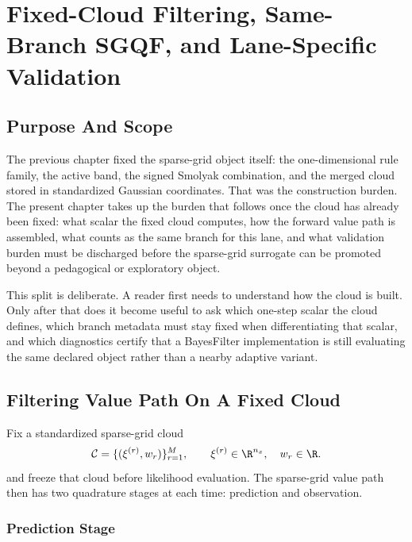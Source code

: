 \chapter{Fixed-Cloud Filtering, Same-Branch SGQF, and Lane-Specific Validation}
\label{ch:bf-highdim-fixed-cloud-sgqf-validation}
\providecommand{\widehatell}{\widehat{\ell}}
\providecommand{\dotwidehatell}{\dot{\widehat{\ell}}}
\providecommand{\dd}{\,\mathrm d}

\section{Purpose And Scope}
\label{sec:bf-hd-sgqf-validation-purpose}

The previous chapter fixed the sparse-grid object itself: the one-dimensional
rule family, the active band, the signed Smolyak combination, and the merged
cloud stored in standardized Gaussian coordinates.  That was the construction
burden.  The present chapter takes up the burden that follows once the cloud has
already been fixed: what scalar the fixed cloud computes, how the forward value
path is assembled, what counts as the same branch for this lane, and what
validation burden must be discharged before the sparse-grid surrogate can be
promoted beyond a pedagogical or exploratory object.

This split is deliberate.  A reader first needs to understand how the cloud is
built.  Only after that does it become useful to ask which one-step scalar the
cloud defines, which branch metadata must stay fixed when differentiating that
scalar, and which diagnostics certify that a BayesFilter implementation is still
evaluating the same declared object rather than a nearby adaptive variant.

\section{Filtering Value Path On A Fixed Cloud}
\label{sec:bf-hd-sgqf-value-path}

Fix a standardized sparse-grid cloud
\begin{equation}
  \mathcal C=\{(\xi^{(r)},w_r)\}_{r=1}^M,
  \qquad
  \xi^{(r)}\in\R^{n_x},
  \quad
  w_r\in\R.
  \label{eq:bf-hd-sgqf-cloud-for-filter}
\end{equation}
and freeze that cloud before likelihood evaluation.  The sparse-grid value path
then has two quadrature stages at each time: prediction and observation.

\subsection{Prediction Stage}
\label{sec:bf-hd-sgqf-prediction-stage}

